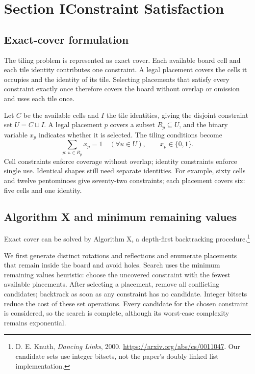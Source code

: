 \documentclass[UTF8,fontset=fandol,11pt,a4paper]{ctexart}
\begin{document}
\makeassignmenttitle

\section{Section I\quad Constraint Satisfaction}
\subsection{Exact-cover formulation}
The tiling problem is represented as exact cover. Each available board cell
and each tile identity contributes one constraint. A legal placement covers
the cells it occupies and the identity of its tile. Selecting placements that
satisfy every constraint exactly once therefore covers the board without
overlap or omission and uses each tile once.

Let $C$ be the available cells and $I$ the tile identities, giving the
disjoint constraint set $U=C\sqcup I$. A legal placement $p$ covers a subset
$R_p\subseteq U$, and the binary variable $x_p$ indicates whether it is selected.
The tiling conditions become
\begin{equation}
 \sum_{p:\,u\in R_p}x_p=1\quad(\forall u\in U),
 \qquad x_p\in\{0,1\}.
 \label{eq:exact-cover}
\end{equation}
Cell constraints enforce coverage without overlap; identity constraints
enforce single use. Identical shapes still need separate identities.
For example, sixty cells and twelve pentominoes give seventy-two constraints;
each placement covers six: five cells and one identity.

\subsection{Algorithm X and minimum remaining values}
Exact cover can be solved by Algorithm X, a depth-first backtracking
procedure.\footnote{D. E. Knuth, \emph{Dancing Links}, 2000.
\url{https://arxiv.org/abs/cs/0011047}. Our candidate sets use integer bitsets,
not the paper's doubly linked list implementation.}

We first generate distinct rotations and reflections and enumerate placements
that remain inside the board and avoid holes. Search uses the minimum
remaining values heuristic: choose the uncovered constraint with the fewest
available placements. After selecting a placement, remove all conflicting
candidates; backtrack as soon as any constraint has no candidate. Integer
bitsets reduce the cost of these set operations. Every candidate for the
chosen constraint is considered, so the search is complete, although its
worst-case complexity remains exponential.
\end{document}
